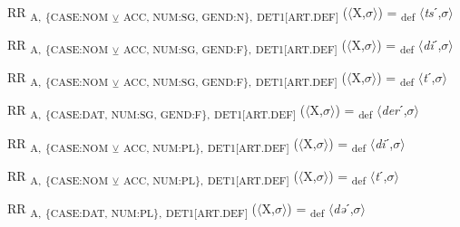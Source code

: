 {\begin{exe}
 RR \textsubscript{A,} \textsubscript{\{CASE:NOM} \textsubscript{${\veebar}$}\textsubscript{ ACC, NUM:SG, GEND:N\},} \textsubscript{DET1[ART.DEF]} ($\langle$X,$\sigma $$\rangle$) = \textsubscript{def} $\langle$\textit{ts}ˊ,$\sigma $$\rangle$
\end{exe}

\begin{exe}
 RR \textsubscript{A,} \textsubscript{\{CASE:NOM} \textsubscript{${\veebar}$}\textsubscript{ ACC, NUM:SG, GEND:F\},} \textsubscript{DET1[ART.DEF]} ($\langle$X,$\sigma $$\rangle$) = \textsubscript{def} $\langle$\textit{di}ˊ,$\sigma $$\rangle$
\end{exe}

\begin{exe}
 RR \textsubscript{A,} \textsubscript{\{CASE:NOM} \textsubscript{${\veebar}$}\textsubscript{ ACC, NUM:SG, GEND:F\},} \textsubscript{DET1[ART.DEF]} ($\langle$X,$\sigma $$\rangle$) = \textsubscript{def} $\langle$\textit{t}ˊ,$\sigma $$\rangle$
\end{exe}

\begin{exe}
 RR \textsubscript{A,} \textsubscript{\{CASE:DAT, NUM:SG, GEND:F\},} \textsubscript{DET1[ART.DEF]} ($\langle$X,$\sigma $$\rangle$) = \textsubscript{def} $\langle$\textit{der}ˊ,$\sigma $$\rangle$
\end{exe}

\begin{exe}
 RR \textsubscript{A,} \textsubscript{\{CASE:NOM} \textsubscript{${\veebar}$}\textsubscript{ ACC, NUM:PL\},} \textsubscript{DET1[ART.DEF]} ($\langle$X,$\sigma $$\rangle$) = \textsubscript{def} $\langle$\textit{di}ˊ,$\sigma $$\rangle$
\end{exe}

\begin{exe}
 RR \textsubscript{A,} \textsubscript{\{CASE:NOM} \textsubscript{${\veebar}$}\textsubscript{ ACC, NUM:PL\},} \textsubscript{DET1[ART.DEF]} ($\langle$X,$\sigma $$\rangle$) = \textsubscript{def} $\langle$\textit{t}ˊ,$\sigma $$\rangle$
\end{exe}

\begin{exe}
 RR \textsubscript{A,} \textsubscript{\{CASE:DAT, NUM:PL\},} \textsubscript{DET1[ART.DEF]} ($\langle$X,$\sigma $$\rangle$) = \textsubscript{def} $\langle$\textit{də}ˊ,$\sigma $$\rangle$
\end{exe}

}
